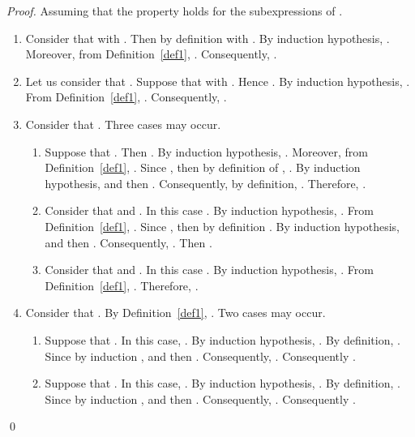 \documentclass{llncs}
\begin{document}
\begin{proof}
  Assuming that the property holds for the subexpressions 
of . 
\begin{enumerate}
\item Consider that  with . Then by definition  with . By induction hypothesis, . Moreover, from Definition~\ref{def1}, . Consequently, .
\item Let us consider that . Suppose that  with . Hence . By induction hypothesis, . From Definition~\ref{def1}, . Consequently, .
\item Consider that . Three cases may occur.
   \begin{enumerate}
     \item Suppose that . Then . By induction hypothesis, . Moreover, from Definition~\ref{def1}, . Since , then by definition of , . By induction hypothesis,  and then . Consequently, by definition, . Therefore, . 
\item Consider that  and . In this case . By induction hypothesis, . From Definition~\ref{def1}, . Since , then by definition . By induction hypothesis,  and then . Consequently, . Then .      
\item Consider that  and . In this case . By induction hypothesis, . From Definition~\ref{def1}, . Therefore, . 
      \end{enumerate}
\item Consider that . By Definition~\ref{def1}, . Two cases may occur.
     \begin{enumerate}
       \item Suppose that . In this case, . By induction hypothesis, . By definition, . Since by induction ,  and then . Consequently, . Consequently .
       \item Suppose that . In this case, . By induction hypothesis, . By definition, . Since by induction ,  and then . Consequently, . Consequently .
     \end{enumerate}
  \end{enumerate}
  \qed
 \end{proof}
\end{document}
